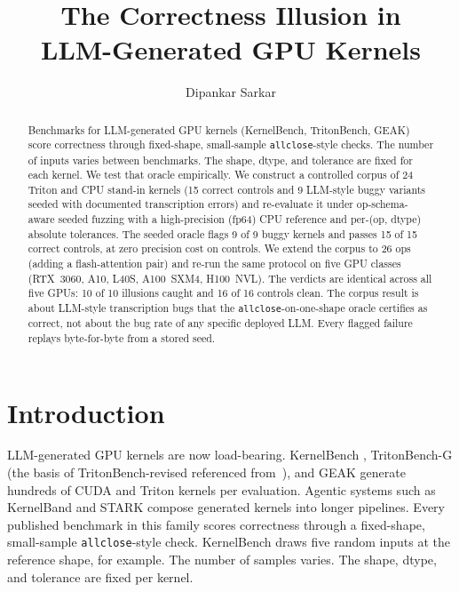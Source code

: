 \documentclass[runningheads]{llncs}
\begin{document}
\title{The Correctness Illusion in\\LLM-Generated GPU Kernels}

\author{Dipankar Sarkar}

\maketitle

\begin{abstract}
Benchmarks for LLM-generated GPU kernels (KernelBench, TritonBench,
GEAK) score correctness through fixed-shape, small-sample
\texttt{allclose}-style checks. The number of inputs varies between
benchmarks. The shape, dtype, and tolerance are fixed for each kernel.
We test that oracle empirically. We construct a controlled corpus of
24 Triton and CPU stand-in kernels (15 correct controls and 9
LLM-style buggy variants seeded with documented transcription errors)
and re-evaluate it under op-schema-aware seeded fuzzing with a
high-precision (fp64) CPU reference and per-(op, dtype) absolute
tolerances. The seeded oracle flags 9 of 9 buggy kernels and passes 15
of 15 correct controls, at zero precision cost on controls. We extend
the corpus to 26 ops (adding a flash-attention pair) and re-run the
same protocol on five GPU classes (RTX~3060, A10, L40S, A100~SXM4,
H100~NVL). The verdicts are identical across all five GPUs: 10 of 10
illusions caught and 16 of 16 controls clean. The corpus result is
about LLM-style transcription bugs that the
\texttt{allclose}-on-one-shape oracle certifies as correct, not about
the bug rate of any specific deployed LLM. Every flagged failure
replays byte-for-byte from a stored seed.
\end{abstract}

\section{Introduction}
\label{sec:intro}

LLM-generated GPU kernels are now load-bearing. KernelBench
\cite{kernelbench2025}, TritonBench-G (the basis of TritonBench-revised
referenced from~\cite{geak2025}), and GEAK \cite{geak2025} generate
hundreds of CUDA and Triton kernels per evaluation. Agentic systems
such as KernelBand \cite{kernelband2025} and STARK \cite{stark2025}
compose generated kernels into longer pipelines. Every published
benchmark in this family scores correctness through a fixed-shape,
small-sample \texttt{allclose}-style check. KernelBench
\cite{kernelbench2025} draws five random inputs at the reference
shape, for example. The number of samples varies. The shape, dtype,
and tolerance are fixed per kernel.
\end{document}
